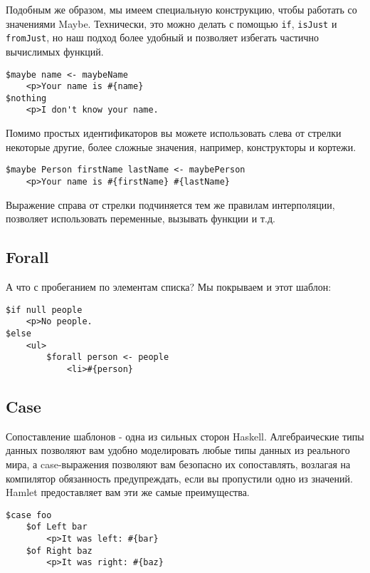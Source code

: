 Подобным же образом, мы имеем специальную конструкцию, чтобы работать 
со значениями Maybe. Технически, это можно делать с помощью \texttt{if}, 
\texttt{isJust} и \texttt{fromJust}, но наш подход более удобный и позволяет
избегать частично вычислимых функций.

\begin{lstlisting}
$maybe name <- maybeName
    <p>Your name is #{name}
$nothing
    <p>I don't know your name.
\end{lstlisting}

Помимо простых идентификаторов вы можете использовать слева от стрелки некоторые другие, 
более сложные значения, например, конструкторы и кортежи.

\begin{lstlisting}
$maybe Person firstName lastName <- maybePerson
    <p>Your name is #{firstName} #{lastName}
\end{lstlisting}

Выражение справа от стрелки подчиняется тем же правилам интерполяции, 
позволяет использовать переменные, вызывать функции и т.д.

\subsection{Forall}

А что с пробеганием по элементам списка? Мы покрываем и этот шаблон:

\begin{lstlisting}
$if null people
    <p>No people.
$else
    <ul>
        $forall person <- people
            <li>#{person}
\end{lstlisting}


\subsection{Case}

Сопоставление шаблонов - одна из сильных сторон Haskell. Алгебраические типы данных
позволяют вам удобно моделировать любые типы данных из реального мира, а 
case-выражения позволяют вам безопасно их сопоставлять, возлагая на компилятор
обязанность предупреждать, если вы пропустили одно из значений.
Hamlet предоставляет вам эти же самые преимущества.

\begin{lstlisting}
$case foo
    $of Left bar
        <p>It was left: #{bar}
    $of Right baz
        <p>It was right: #{baz}
\end{lstlisting}

